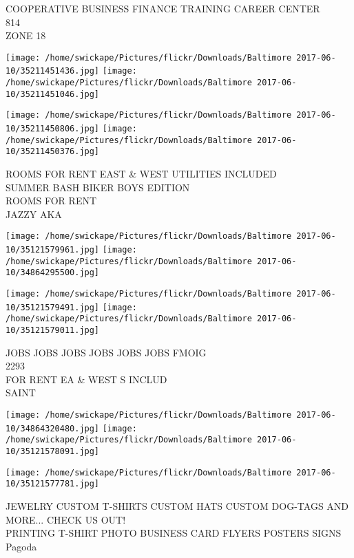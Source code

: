 \documentclass[10pt,letterpaper]{article}
\begin{document}
COOPERATIVE BUSINESS FINANCE TRAINING CAREER CENTER\\
814\\
ZONE 18\\
\pagebreak

\texttt{[image: /home/swickape/Pictures/flickr/Downloads/Baltimore 2017-06-10/35211451436.jpg]}
\texttt{[image: /home/swickape/Pictures/flickr/Downloads/Baltimore 2017-06-10/35211451046.jpg]}

\texttt{[image: /home/swickape/Pictures/flickr/Downloads/Baltimore 2017-06-10/35211450806.jpg]}
\texttt{[image: /home/swickape/Pictures/flickr/Downloads/Baltimore 2017-06-10/35211450376.jpg]}

ROOMS FOR RENT EAST \& WEST UTILITIES INCLUDED\\
SUMMER BASH BIKER BOYS EDITION\\
ROOMS FOR RENT\\
JAZZY AKA\\
\pagebreak

\texttt{[image: /home/swickape/Pictures/flickr/Downloads/Baltimore 2017-06-10/35121579961.jpg]}
\texttt{[image: /home/swickape/Pictures/flickr/Downloads/Baltimore 2017-06-10/34864295500.jpg]}

\texttt{[image: /home/swickape/Pictures/flickr/Downloads/Baltimore 2017-06-10/35121579491.jpg]}
\texttt{[image: /home/swickape/Pictures/flickr/Downloads/Baltimore 2017-06-10/35121579011.jpg]}

JOBS JOBS JOBS JOBS JOBS JOBS FMOIG\\
2293\\
FOR RENT EA \& WEST S INCLUD\\
SAINT\\
\pagebreak

\texttt{[image: /home/swickape/Pictures/flickr/Downloads/Baltimore 2017-06-10/34864320480.jpg]}
\texttt{[image: /home/swickape/Pictures/flickr/Downloads/Baltimore 2017-06-10/35121578091.jpg]}

\texttt{[image: /home/swickape/Pictures/flickr/Downloads/Baltimore 2017-06-10/35121577781.jpg]}

JEWELRY CUSTOM T{-}SHIRTS CUSTOM HATS CUSTOM DOG{-}TAGS AND MORE... CHECK US OUT!\\
PRINTING T{-}SHIRT PHOTO BUSINESS CARD FLYERS POSTERS SIGNS\\
Pagoda\\
\pagebreak
\end{document}
